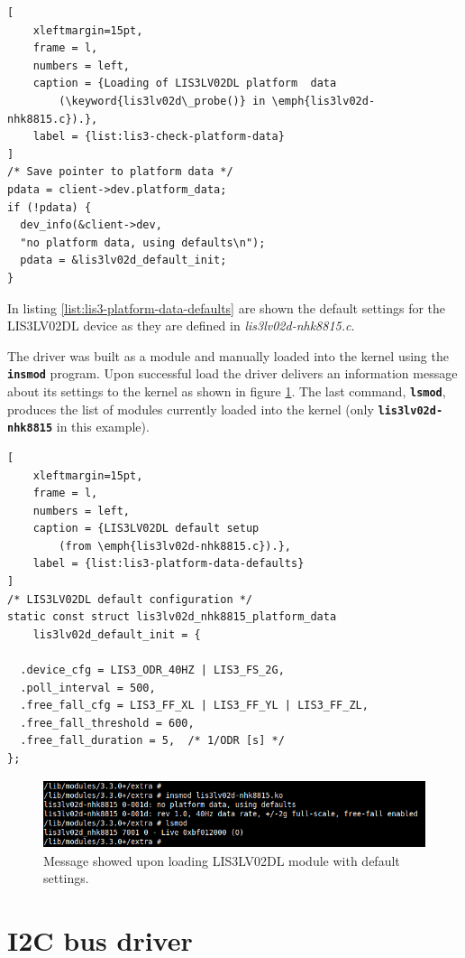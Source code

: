 \documentclass[a4paper,10pt]{article}
\newcommand{\keyword}[1]{\texttt{\textbf{#1}}}
\begin{document}
\begin{multicols}{2}
\begin{lstlisting}[
	xleftmargin=15pt,
	frame = l,
	numbers = left,
	caption = {Loading of LIS3LV02DL platform  data
		(\keyword{lis3lv02d\_probe()} in \emph{lis3lv02d-nhk8815.c}).},
	label = {list:lis3-check-platform-data}
]
/* Save pointer to platform data */
pdata = client->dev.platform_data;
if (!pdata) {
  dev_info(&client->dev,
  "no platform data, using defaults\n");
  pdata = &lis3lv02d_default_init;
}
\end{lstlisting}

In listing \ref{list:lis3-platform-data-defaults} are shown the default settings
for the LIS3LV02DL device as they are defined in \emph{lis3lv02d-nhk8815.c}.

The driver was built as a module and manually loaded into the kernel using the
\keyword{insmod} program. Upon successful load the driver delivers an information
message about its settings to the kernel as shown in figure \ref{fig:lis3-insmod}.
The last command, \keyword{lsmod}, produces the list of modules currently loaded
into the kernel (only \keyword{lis3lv02d-nhk8815} in this example).

\begin{lstlisting}[
	xleftmargin=15pt,
	frame = l,
	numbers = left,
	caption = {LIS3LV02DL default setup
		(from \emph{lis3lv02d-nhk8815.c}).},
	label = {list:lis3-platform-data-defaults}
]
/* LIS3LV02DL default configuration */
static const struct lis3lv02d_nhk8815_platform_data
	lis3lv02d_default_init = {

  .device_cfg = LIS3_ODR_40HZ | LIS3_FS_2G,
  .poll_interval = 500,
  .free_fall_cfg = LIS3_FF_XL | LIS3_FF_YL | LIS3_FF_ZL,
  .free_fall_threshold = 600,
  .free_fall_duration = 5,	/* 1/ODR [s] */
};
\end{lstlisting}

\begin{figure}
 \includegraphics[width=11.7cm, height=2cm]{./figures/lis3lv02d-insmod.png}
 \caption{Message showed upon loading LIS3LV02DL module with default settings.}
 \label{fig:lis3-insmod}
\end{figure}



\section{I2C bus driver}
\label{sec:i2c_bus_driver}


\end{multicols}
\end{document}
